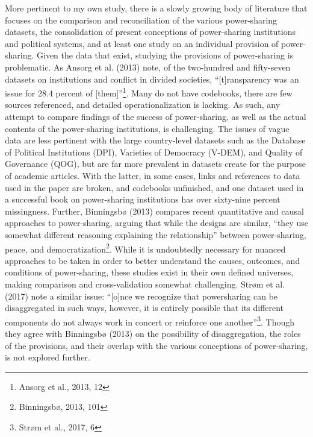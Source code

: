 \documentclass[12pt]{article}
\begin{document}
More pertinent to my own study, there is a slowly growing body of literature that focuses on the comparison and reconciliation of the various power-sharing datasets, the consolidation of present conceptions of power-sharing institutions and political systems, and at least one study on an individual provision of power-sharing. Given the data that exist, studying the provisions of power-sharing is problematic. As Ansorg et al. (2013) note, of the two-hundred and fifty-seven datasets on institutions and conflict in divided societies, ``[t]ransparency was an issue for 28.4 percent of [them]''\footnote{Ansorg et al., 2013, 12}. Many do not have codebooks, there are few sources referenced, and detailed operationalization is lacking. As such, any attempt to compare findings of the success of power-sharing, as well as the actual contents of the power-sharing institutions, is challenging. The issues of vague data are less pertinent with the large country-level datasets such as the Database of Political Institutions (DPI), Varieties of Democracy (V-DEM), and Quality of Governance (QOG), but are far more prevalent in datasets create for the purpose of academic articles. With the latter, in some cases, links and references to data used in the paper are broken, and codebooks unfinished, and one dataset used in a successful book on power-sharing institutions has over sixty-nine percent missingness. Further, Binningsbø (2013) compares recent quantitative and causal approaches to power-sharing, arguing that while the designs are similar, ``they use somewhat different reasoning explaining the relationship'' between power-sharing, peace, and democratization\footnote{Binningsbø, 2013, 101}. While it is undoubtedly necessary for nuanced approaches to be taken in order to better understand the causes, outcomes, and conditions of power-sharing, these studies exist in their own defined universes, making comparison and cross-validation somewhat challenging. Strøm et al. (2017) note a similar issue: ``[o]nce we recognize that powersharing can be disaggregated in such ways, however, it is entirely possible that its different components do not always work in concert or reinforce one another''\footnote{Strøm et al., 2017, 6}. Though they agree with Binningsbø (2013) on the possibility of disaggregation, the roles of the provisions, and their overlap with the various conceptions of power-sharing, is not explored further. 
\end{document}
